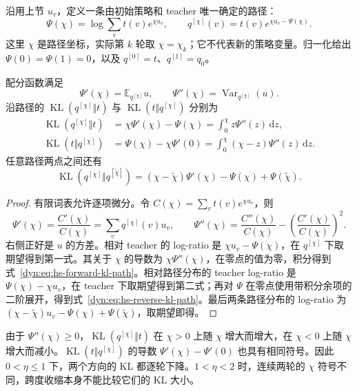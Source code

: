 \documentclass[lang=cn,scheme=chinese,openany]{../book/elegantbook}
\newcommand{\E}{\mathbb E}
\newcommand{\KL}{\operatorname{KL}}
\newcommand{\Var}{\operatorname{Var}}
\begin{document}
沿用上节 $u_v$，定义一条由初始策略和 teacher 唯一确定的路径：
\begin{equation*}
 \Psi(\chi)=\log\sum_vt(v)e^{\chi u_v},\qquad
 q^{[\chi]}(v)=t(v)e^{\chi u_v-\Psi(\chi)}.
\end{equation*}
这里 $\chi$ 是路径坐标，实际第 $k$ 轮取 $\chi=\chi_k$；它不代表新的策略变量。归一化给出 $\Psi(0)=\Psi(1)=0$，以及 $q^{[0]}=t$、$q^{[1]}=q_0$。

\begin{theorem}[KL 路径的精确积分]
\label{dyn:thm:hs-kl-path}
配分函数满足
\begin{equation*}
 \Psi'(\chi)=\E_{q^{[\chi]}}u,
 \qquad\Psi''(\chi)=\Var_{q^{[\chi]}}(u).
\end{equation*}
沿路径的 $\KL(q^{[\chi]}\Vert t)$ 与 $\KL(t\Vert q^{[\chi]})$ 分别为
\begin{align}
 \KL(q^{[\chi]}\Vert t)
 &=\chi\Psi'(\chi)-\Psi(\chi)
 =\int_0^\chi z\Psi''(z)\,\mathrm dz,
 \label{dyn:eq:hs-forward-kl-path}\\
 \KL(t\Vert q^{[\chi]})
 &=\Psi(\chi)-\chi\Psi'(0)
 =\int_0^\chi(\chi-z)\Psi''(z)\,\mathrm dz.
 \label{dyn:eq:hs-reverse-kl-path}
\end{align}
任意路径两点之间还有
\begin{equation*}
 \KL(q^{[\chi]}\Vert q^{[\widetilde\chi]})
 =(\chi-\widetilde\chi)\Psi'(\chi)-\Psi(\chi)+\Psi(\widetilde\chi).
\end{equation*}
\end{theorem}

\begin{proof}
有限词表允许逐项微分。令 $C(\chi)=\sum_vt(v)e^{\chi u_v}$，则
\begin{equation*}
 \Psi'(\chi)=\frac{C'(\chi)}{C(\chi)}=\sum_vq^{[\chi]}(v)u_v,
 \qquad
 \Psi''(\chi)=\frac{C''(\chi)}{C(\chi)}-
          \left(\frac{C'(\chi)}{C(\chi)}\right)^2.
\end{equation*}
右侧正好是 $u$ 的方差。相对 teacher 的 log-ratio 是 $\chi u_v-\Psi(\chi)$，在 $q^{[\chi]}$ 下取期望得到第一式。其关于 $\chi$ 的导数为 $\chi\Psi''(\chi)$，在零点的值为零，积分得到式~\eqref{dyn:eq:hs-forward-kl-path}。相对路径分布的 teacher log-ratio 是 $\Psi(\chi)-\chi u_v$，在 teacher 下取期望得到第二式；再对 $\Psi$ 在零点使用带积分余项的二阶展开，得到式~\eqref{dyn:eq:hs-reverse-kl-path}。最后两条路径分布的 log-ratio 为 $(\chi-\widetilde\chi)u_v-\Psi(\chi)+\Psi(\widetilde\chi)$，取期望即得。
\end{proof}

由于 $\Psi''(\chi)\geq0$，$\KL(q^{[\chi]}\Vert t)$ 在 $\chi>0$ 上随 $\chi$ 增大而增大，在 $\chi<0$ 上随 $\chi$ 增大而减小。$\KL(t\Vert q^{[\chi]})$ 的导数 $\Psi'(\chi)-\Psi'(0)$ 也具有相同符号。因此 $0<\eta\leq1$ 下，两个方向的 KL 都逐轮下降。$1<\eta<2$ 时，连续两轮的 $\chi$ 符号不同，跨度收缩本身不能比较它们的 KL 大小。
\end{document}

